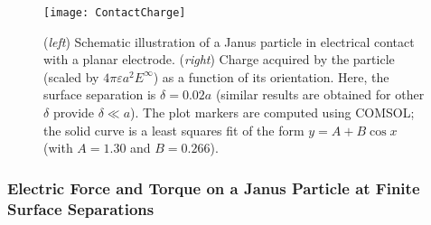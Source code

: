 \begin{appendices}
\begin{figure}[h]
    \centering
    \texttt{[image: ContactCharge]}
    \caption{(\emph{left}) Schematic illustration of a Janus particle in electrical contact with a planar electrode. (\emph{right}) Charge acquired by the particle (scaled by $4\pi \varepsilon a^2 E^{\infty}$) as a function of its orientation.  Here, the surface separation is $\delta= 0.02 a$ (similar results are obtained for other $\delta$ provide $\delta\ll a$). The plot markers are computed using COMSOL; the solid curve is a least squares fit of the form $y=A + B \cos x$ (with $A=1.30$ and $B=0.266$).}
    \label{fig:ContactCharge}
\end{figure}


\subsubsection{Electric Force and Torque on a Janus Particle at Finite Surface Separations}


\end{appendices}
